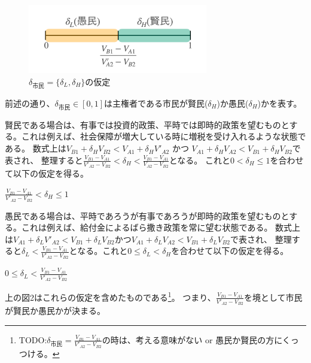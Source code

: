 \documentclass[main.tex]{subfiles}
\begin{document}
\begin{figure}[htbp]
  \centering
  \includegraphics[width=0.7\textwidth]{./image/assumption_citizen_discount_rate.png}
  \caption{$\delta_{市民}=\lbrace \delta_L, \delta_H \rbrace$の仮定} 
  \label{fig:assumption_citizen_discount_rate}
\end{figure}


前述の通り、$\delta_{市民}\in[0,1]$は主権者である市民が賢民($\delta_H$)か愚民($\delta_H$)かを表す。

賢民である場合は、有事では投資的政策、平時では即時的政策を望むものとする。これは例えば、社会保障が増大している時に増税を受け入れるような状態である。
数式上は$V_{B1} + \delta_H V_{B2} < V_{A1} + \delta_H V'_{A2}$ かつ $V_{A1} + \delta_H V_{A2} < V_{B1} + \delta_H V_{B2}$で表され、
整理すると$\frac{V_{B1} - V_{A1}}{V'_{A2} - V_{B2}} < \delta_H < \frac{V_{B1} - V_{A1}}{V_{A2} - V_{B2}}$となる。
これと$0 < \delta_H \le 1$を合わせて以下の仮定を得る。
\begin{assumption}  $\frac{V_{B1} - V_{A1}}{V'_{A2} - V_{B2}} < \delta_H \le 1$  \end{assumption}


愚民である場合は、平時であろうが有事であろうが即時的政策を望むものとする。これは例えば、給付金によるばら撒き政策を常に望む状態である。
数式上は$V_{A1} + \delta_L V'_{A2} < V_{B1} + \delta_L V_{B2}$かつ$V_{A1} + \delta_L V_{A2} < V_{B1} + \delta_L V_{B2}$で表され、
整理すると$ \delta_L < \frac{V_{B1} - V_{A1}}{V'_{A2} - V_{B2}} $となる。これと$0\le \delta_L < \delta_H$を合わせて以下の仮定を得る。
\begin{assumption}  $0 \le  \delta_L < \frac{V_{B1} - V_{A1}}{V'_{A2} - V_{B2}} $  \end{assumption}

上の図2はこれらの仮定を含めたものである\footnote{TODO:$\delta_{市民} = \frac{V_{B1} - V_{A1}}{V'_{A2} - V_{B2}}$の時は、考える意味がない or 愚民か賢民の方にくっつける。}。
つまり、$\frac{V_{B1} - V_{A1}}{V'_{A2} - V_{B2}}$を境として市民が賢民か愚民かが決まる。 






\theendnotes
\end{document}
